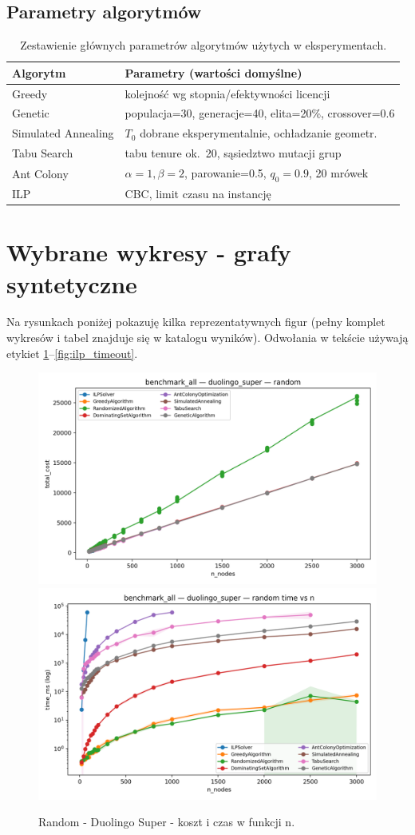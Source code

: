 \subsection*{Parametry algorytmów}
\begin{table}[h]
\centering
\begin{tabular}{@{}ll@{}}
\toprule
Algorytm & Parametry (wartości domyślne) \\
\midrule
Greedy & kolejność wg stopnia/efektywności licencji \\
Genetic & populacja=30, generacje=40, elita=20\%, crossover=0.6 \\
Simulated Annealing & $T_0$ dobrane eksperymentalnie, ochładzanie geometr. \\
Tabu Search & tabu tenure ok.~20, sąsiedztwo mutacji grup \\
Ant Colony & $\alpha=1,\beta=2$, parowanie=0.5, $q_0=0.9$, 20 mrówek \\
ILP & CBC, limit czasu na instancję \\
\bottomrule
\end{tabular}
\caption{Zestawienie głównych parametrów algorytmów użytych w eksperymentach.}
\label{tab:algo_params}
\end{table}

\section{Wybrane wykresy - grafy syntetyczne}
Na rysunkach poniżej pokazuję kilka reprezentatywnych figur (pełny komplet wykresów i tabel znajduje się w katalogu wyników). Odwołania w tekście używają etykiet \ref{fig:random_duo_cost_time}–\ref{fig:ilp_timeout}.

\begin{figure}[h]
  \centering
  \includegraphics[width=0.48\linewidth]{assets/figures/ba_random_duo_cost_vs_n.png}
  \includegraphics[width=0.48\linewidth]{assets/figures/ba_random_duo_time_vs_n.png}
  \caption{Random - Duolingo Super - koszt i czas w funkcji n.}
  \label{fig:random_duo_cost_time}
\end{figure}

